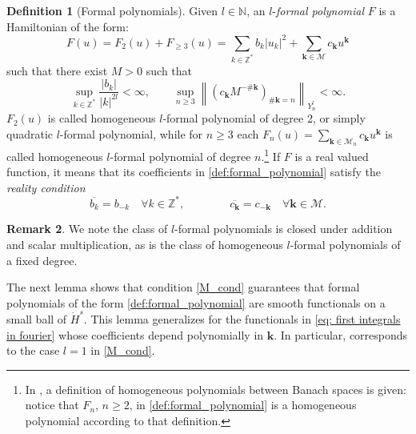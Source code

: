 \documentclass[a4paper,10pt,reqno]{article}
\theoremstyle{definition}
\newtheorem{definition}{Definition}[section]
\theoremstyle{plain}
\theoremstyle{plain}
\theoremstyle{definition}
\theoremstyle{plain}
\theoremstyle{plain}
\theoremstyle{plain}
\theoremstyle{definition}
\newtheorem{rem}[definition]{Remark}
\theoremstyle{definition}
\newcommand{\norm}[1]{\left\lVert #1 \right\rVert}
\def \N{\mathbb N}
\def \Z{\mathbb Z}
\def \M{\mathcal{M}}
\def \k{\bm{k}}
\begin{document}
\begin{definition}[Formal polynomials] \label{def:formal_pol}
Given $l\in\N$, an $l$-\emph{formal polynomial} $F$ is a Hamiltonian of the form:
\begin{equation}\label{def:formal_polynomial}
 F(u)= F_2(u) + F_{\geq 3}(u)=\sum_{k \in \Z^*} b_k |u_k|^2 + \sum_{\k \in \M} c_{\k} u^{\k} 
 \end{equation}
such that there exist $M>0$ such that
\begin{equation}\label{M_cond}
\sup_{k\in\Z^{*}} \frac{|b_k|}{|k|^{2l}} <\infty,\qquad 
 \sup_{n \ge 3} \norm{ (c_{\k} M^{-\#{\k}})_{\#{\k} = n} }_{Y_n^l} < \infty.
 \end{equation}
$F_2(u)$ is called homogeneous $l$-formal polynomial of degree 2, or simply quadratic  $l$-formal polynomial, while for $n \ge 3$ each $F_n(u) = \sum_{\k \in \M_n} c_{\k} u^{\k}$ is called homogeneous  $l$-formal polynomial of degree $n$.\footnote{In \cite[Definition~1]{polynomials}, a definition of homogeneous polynomials between Banach spaces is given: notice that $F_n$, $n \ge 2$, in \eqref{def:formal_polynomial} is a homogeneous polynomial according to that definition.}
If $F$ is a real valued function, it means that its coefficients in \eqref{def:formal_polynomial} satisfy the \emph{reality condition}
\begin{equation} \label{def: reality condition}
\overline{b_k} = b_{-k} \quad \forall k \in \Z^*, \qquad \qquad \overline{c_{\k}} = c_{-\k} \quad \forall \k \in \M.
\end{equation}
\end{definition}

\begin{rem}
    We note the class of $l$-formal polynomials is closed under addition and scalar multiplication, as is the class of homogeneous $l$-formal polynomials of a fixed degree.
\end{rem}

The next lemma shows that condition \eqref{M_cond}
guarantees that formal polynomials of the form \eqref{def:formal_polynomial} are smooth functionals on a small ball of $\dot{H}^s$.
This lemma generalizes \cite[Lemma~3.2]{bernier}
for the functionals in \eqref{eq: first integrals in fourier} whose coefficients depend polynomially in $\k$. In particular, \cite[Lemma~3.2]{bernier} corresponds to the case $l=1$ in \eqref{M_cond}.
\end{document}
